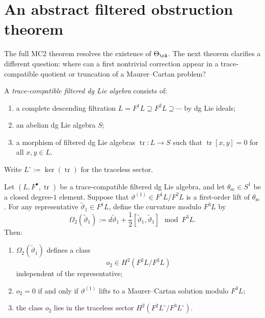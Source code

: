\section{An abstract filtered obstruction theorem}
\label{sec:blr-filtered-obstruction}

The full MC2 theorem resolves the existence of \(\Theta_{\cA}\). The
next theorem clarifies a different question: where can a first
nontrivial correction appear in a trace-compatible quotient or
truncation of a Maurer--Cartan problem?

\begin{definition}
\label{def:trace-compatible-filtered-dglie}
A \emph{trace-compatible filtered dg Lie algebra} consists of:
\begin{enumerate}[label=\textup{(\roman*)}]
\item a complete descending filtration
 \(L=F^1L\supseteq F^2L\supseteq \cdots\)
 by dg Lie ideals;
\item an abelian dg Lie algebra \(S\);
\item a morphism of filtered dg Lie algebras
 \(\operatorname{tr}\colon L\to S\)
 such that \(\operatorname{tr}[x,y]=0\) for all \(x,y\in L\).
\end{enumerate}
Write \(L^\circ:=\ker(\operatorname{tr})\) for the traceless sector.
\end{definition}

\begin{theorem}
\label{thm:first-obstruction-traceless-quadratic}
Let \((L,F^\bullet,\operatorname{tr})\) be a trace-compatible filtered dg
Lie algebra, and let \(\theta_{\mathrm{sc}}\in S^1\) be a closed degree-\(1\)
element. Suppose that \(\vartheta^{(1)}\in F^1L/F^2L\) is a first-order
lift of \(\theta_{\mathrm{sc}}\). For any representative
\(\widetilde\vartheta_1\in F^1L\), define the curvature modulo \(F^3L\) by
\begin{equation}
\label{eq:first-curvature-mod-f3}
\Omega_2(\widetilde\vartheta_1)
:=
 d\widetilde\vartheta_1
 +\frac12[\widetilde\vartheta_1,\widetilde\vartheta_1]
 \mod F^3L.
\end{equation}
Then:
\begin{enumerate}[label=\textup{(\roman*)}]
\item \(\Omega_2(\widetilde\vartheta_1)\) defines a class
 \begin{equation}
 \label{eq:first-obstruction-class}
 o_2\in H^2(F^2L/F^3L)
 \end{equation}
 independent of the representative;
\item \(o_2=0\) if and only if \(\vartheta^{(1)}\) lifts to a
 Maurer--Cartan solution modulo \(F^3L\);
\item the class \(o_2\) lies in the traceless sector
 \(H^2(F^2L^\circ/F^3L^\circ)\).
\end{enumerate}
\end{theorem}

